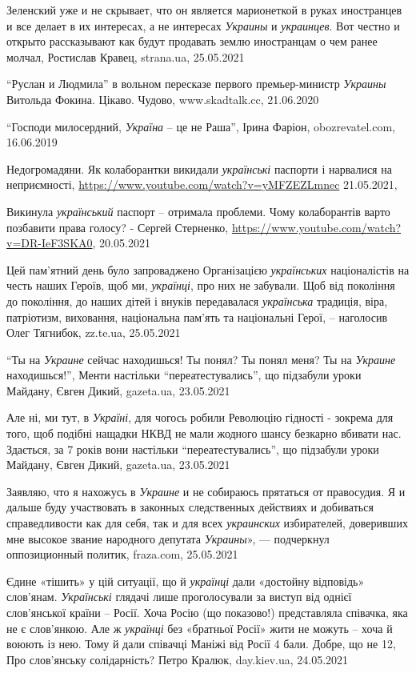 Зеленский уже и не скрывает, что он является марионеткой в руках иностранцев и
все делает в их интересах, а не интересах \emph{Украины} и \emph{украинцев}.
Вот честно и открыто рассказывают как будут продавать землю иностранцам о чем
ранее молчал, Ростислав Кравец, strana.ua, 25.05.2021

\enquote{Руслан и Людмила} в вольном пересказе первого премьер-министр
\emph{Украины} Витольда Фокина. Цікаво. Чудово, www.skadtalk.cc, 21.06.2020

\enquote{Господи милосердний, \emph{Україна} – це не Раша}, Ірина Фаріон,
obozrevatel.com, 16.06.2019

Недогромадяни. Як колаборантки викидали \emph{українські} паспорти і нарвалися
на неприємності, \url{https://www.youtube.com/watch?v=yMFZEZLmnec} 21.05.2021,

Викинула \emph{український} паспорт – отримала проблеми. Чому колаборантів
варто позбавити права голосу? - Сергей Стерненко,
\url{https://www.youtube.com/watch?v=DR-IeF3SKA0}, 20.05.2021

Цей пам'ятний день було запроваджено Організацією \emph{українських} націоналістів на
честь наших Героїв, щоб ми, \emph{українці}, про них не забували. Щоб від покоління до
покоління, до наших дітей і внуків передавалася \emph{українська} традиція, віра,
патріотизм, виховання, національна пам'ять та національні Герої, – наголосив
Олег Тягнибок, zz.te.ua, 25.05.2021

\enquote{Ты на \emph{Украине} сейчас находишься! Ты понял? Ты понял меня? Ты на
\emph{Украине} находишься!}, Менти настільки \enquote{переатестувались}, що
підзабули уроки Майдану, Євген Дикий, gazeta.ua, 23.05.2021

Але ні, ми тут, в \emph{Україні}, для чогось робили Революцію гідності - зокрема для
того, щоб подібні нащадки НКВД не мали жодного шансу безкарно вбивати нас.
Здається, за 7 років вони настільки \enquote{переатестувались}, що підзабули уроки
Майдану, Євген Дикий, gazeta.ua, 23.05.2021

Заявляю, что я нахожусь в \emph{Украине} и не собираюсь прятаться от
правосудия. Я и дальше буду участвовать в законных следственных действиях и
добиваться справедливости как для себя, так и для всех \emph{украинских}
избирателей, доверивших мне высокое звание народного депутата \emph{Украины}»,
— подчеркнул оппозиционный политик, fraza.com, 25.05.2021

Єдине «тішить» у цій ситуації, що й \emph{українці} дали «достойну відповідь»
слов'янам. \emph{Українські} глядачі лише проголосували за виступ від однієї
слов'янської країни – Росії. Хоча Росію (що показово!) представляла співачка,
яка не є слов'янкою. Але ж \emph{українці} без «братньої Росії» жити не можуть – хоча
й воюють із нею. Тому й дали співачці Маніжі від Росії 4 бали. Добре, що не 12, 
Про слов'янську солідарність? Петро Кралюк, day.kiev.ua, 24.05.2021

